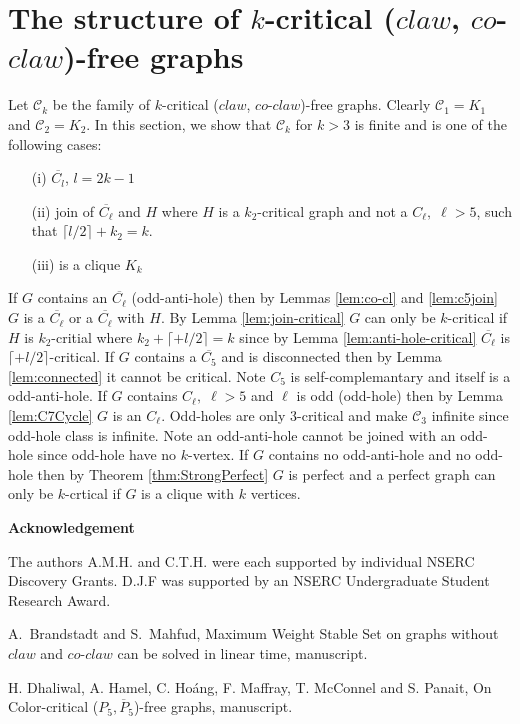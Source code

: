 \documentclass[12pt]{article}
\def\CCO{($claw$, $co$-$claw$)}
\begin{document}
\section{The structure of $k$-critical {\CCO}-free graphs}\label{sec:characterization}
%
Let $\mathcal{C}_k$ be the family of $k$-critical {\CCO}-free graphs. Clearly $\mathcal{C}_1 = {K_1}$ and $\mathcal{C}_2 = {K_2}$.
In this section, we show that $\mathcal{C}_k$ for $k > 3$ is finite and is one of the following cases:
\begin{itemize}
\item[(i)]
$\overline{C_l}$, $l = 2k-1$
\item[(ii)]
join of $\overline{C_\ell}$ and $H$ where $H$ is a $k_2$-critical graph and not a $C_\ell,\; \ell > 5$, such that  $\lceil l/2 \rceil + k_2 = k$.
\item[(iii)]
is a clique $K_k$
\end{itemize} 
 If $G$ contains an $\overline{C_\ell}$ (odd-anti-hole) then by Lemmas \ref{lem:co-cl} and \ref{lem:c5join} $G$ is a $\overline{C_\ell}$ or a $\overline{C_\ell}$ with $H$. By Lemma \ref{lem:join-critical} $G$ can only be $k$-critical if $H$ is $k_2$-critial where $k_2 + \lceil + l/2 \rceil = k$ since by Lemma \ref{lem:anti-hole-critical} $\overline{C_\ell}$ is $\lceil + l/2 \rceil$-critical. If $G$ contains a $\overline{C_5}$ and is disconnected then by Lemma \ref{lem:connected} it cannot be critical. Note $C_5$ is self-complemantary and itself is a odd-anti-hole. If $G$ contains $C_\ell,\; \ell >5$ and $\ell$ is odd (odd-hole) then by Lemma \ref{lem:C7Cycle} $G$ is an $C_\ell$. Odd-holes are only 3-critical and make $\mathcal{C}_3$ infinite since odd-hole class is infinite. Note an odd-anti-hole cannot be joined with an odd-hole since odd-hole have no $k$-vertex. If $G$ contains no odd-anti-hole and no odd-hole then by Theorem \ref{thm:StrongPerfect} $G$ is perfect and a perfect graph can only be $k$-crtical if $G$ is a clique with $k$ vertices.

\begin{center}
{\bf Acknowledgement}
\end{center}
The authors A.M.H. and C.T.H. were each supported by individual NSERC Discovery Grants. D.J.F was supported by an NSERC Undergraduate Student Research Award.


\clearpage
\begin{thebibliography}{99}

  A.~Brandstadt and S.~Mahfud, Maximum Weight Stable Set on graphs without $claw$ and $co$-$claw$ can be solved in linear time, manuscript.

  H. Dhaliwal, A. Hamel, C. Ho\'{a}ng, F. Maffray, T. McConnel and S. Panait, On Color-critical ($P_5, \overline{P}_5$)-free graphs, manuscript.

\end{thebibliography}
\end{document}
